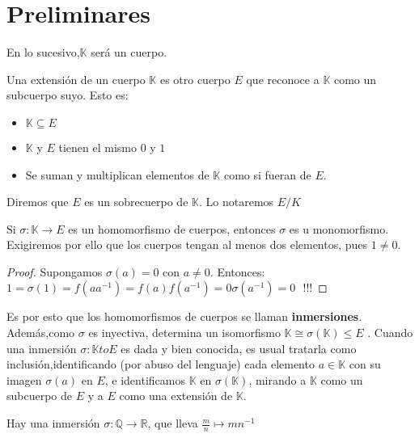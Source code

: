 \section{Preliminares}
En lo sucesivo,$\mathbb{K}$ será un cuerpo.
\begin{ndef}
Una extensión de un cuerpo $\mathbb K$ es otro cuerpo $E$ que reconoce a $\mathbb K$ como un subcuerpo suyo. Esto es:
\begin{itemize}
\item $\mathbb K \subseteq E$
\item $\mathbb K$ y $E$ tienen el mismo $0$ y $1$
\item Se suman y multiplican elementos de $\mathbb K$ como si fueran de $E$.
\end{itemize}
Diremos que $E$ es un sobrecuerpo de $\mathbb K$. Lo notaremos $E/K$
\end{ndef}

\begin{nprop}
Si $\sigma:\mathbb K \to E$ es un homomorfismo de cuerpos, entonces $\sigma$ es u monomorfismo.
Exigiremos por ello que los cuerpos tengan al menos dos elementos, pues $1\ne0$.
\end{nprop}
\begin{proof}
Supongamos $\sigma(a) = 0$ con $a\ne 0$. Entonces: $1 = \sigma(1) = f(aa^{-1}) = f(a)f(a^{-1}) = 0 \sigma(a^{-1}) = 0 \ \ \ !!!$
\end{proof}

Es por esto que los homomorfismos de cuerpos se llaman \textbf{inmersiones}. Además,como $\sigma$ es inyectiva, determina un isomorfismo $\mathbb K \cong \sigma(\mathbb K) \leq E$ .
Cuando una inmersión $\sigma : \mathbb K to E$ es dada y bien conocida, es usual tratarla como inclusión,identificando (por abuso del lenguaje) cada elemento $a\in \mathbb K$ con su imagen $\sigma(a)$ en $E$, e identificamos $\mathbb K$ en $\sigma(\mathbb K)$, mirando a $\mathbb K$ como un subcuerpo de $E$ y a $E$ como una extensión de $\mathbb K$.

\begin{ejemplo}
Hay una inmersión $\sigma : \mathbb Q \to \mathbb R$, que lleva $\frac{m}{n}\mapsto mn^{-1}$
\end{ejemplo}
